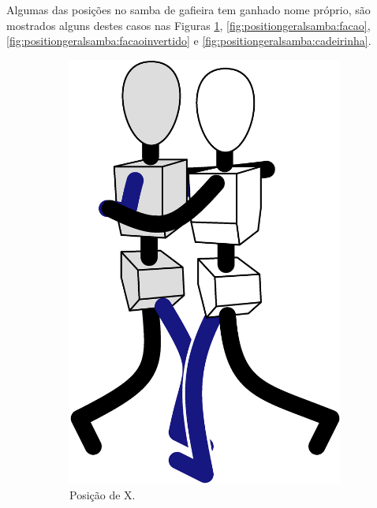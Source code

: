 Algumas das posições no samba de gafieira tem ganhado nome próprio, 
são mostrados alguns destes casos nas
Figuras \ref{fig:positiongeralsamba:x}, \ref{fig:positiongeralsamba:facao}, 
\ref{fig:positiongeralsamba:facaoinvertido} e \ref{fig:positiongeralsamba:cadeirinha}.
\begin{figure}[!ht]
     \centering
     \begin{subfigure}[b]{0.1805\textwidth}
         \centering
         \includegraphics[width=\textwidth]{chapters/cap-normas/position-x.eps}
         \caption{Posição de X.}
         \label{fig:positiongeralsamba:x}
     \end{subfigure}
     \hfill
     \begin{subfigure}[b]{0.19475\textwidth}

\end{subfigure}
\end{figure}
